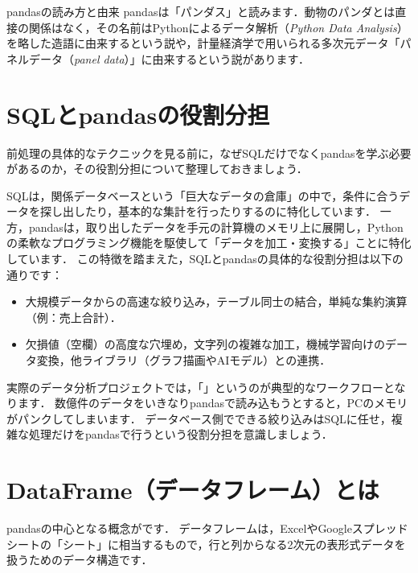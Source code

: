 \begin{notebox}{pandasの読み方と由来}
pandasは「パンダス」と読みます．動物のパンダとは直接の関係はなく，その名前はPythonによるデータ解析（\textit{Python Data Analysis}）を略した造語に由来するという説や，計量経済学で用いられる多次元データ「パネルデータ（\textit{panel data}）」に由来するという説があります．
\end{notebox}

\section{SQLとpandasの役割分担}
前処理の具体的なテクニックを見る前に，なぜSQLだけでなくpandasを学ぶ必要があるのか，その役割分担について整理しておきましょう．

SQLは，関係データベースという「巨大なデータの倉庫」の中で，条件に合うデータを探し出したり，基本的な集計を行ったりするのに特化しています．
一方，pandasは，取り出したデータを手元の計算機のメモリ上に展開し，Pythonの柔軟なプログラミング機能を駆使して「データを加工・変換する」ことに特化しています．
この特徴を踏まえた，SQLとpandasの具体的な役割分担は以下の通りです：
\begin{itemize}
    \item {} 大規模データからの高速な絞り込み，テーブル同士の結合，単純な集約演算（例：売上合計）．
    \item {} 欠損値（空欄）の高度な穴埋め，文字列の複雑な加工，機械学習向けのデータ変換，他ライブラリ（グラフ描画やAIモデル）との連携．
\end{itemize}

実際のデータ分析プロジェクトでは，「」というのが典型的なワークフローとなります．
数億件のデータをいきなりpandasで読み込もうとすると，PCのメモリがパンクしてしまいます．
データベース側でできる絞り込みはSQLに任せ，複雑な処理だけをpandasで行うという役割分担を意識しましょう．

\section{DataFrame（データフレーム）とは}
pandasの中心となる概念がです．
データフレームは，ExcelやGoogleスプレッドシートの「シート」に相当するもので，行と列からなる2次元の表形式データを扱うためのデータ構造です．

